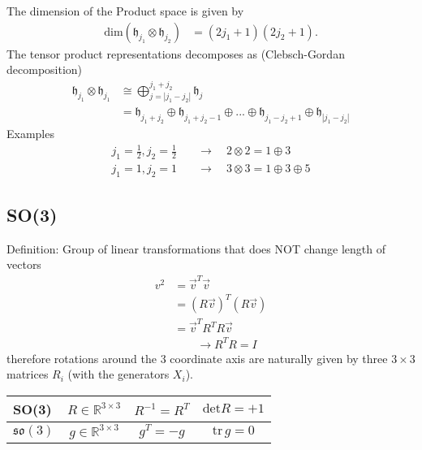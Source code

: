 \documentclass[../main.tex]{subfiles}
\begin{document}
\begin{itemize}
The dimension of the Product space is given by
\begin{align}
\text{dim}(\mathfrak{h}_{j_1} \otimes \mathfrak{h}_{j_2})&=(2j_1+1)(2j_2+1).
\end{align}
The tensor product representations decomposes as ({\sc Clebsch-Gordan} decomposition)
\begin{align}
    \mathfrak{h}_{j_1} \otimes \mathfrak{h}_{j_1} &\cong \bigoplus_{j=|j_1-j_2|}^{j_1+j_2} \mathfrak{h}_{j}\\
    &=\mathfrak{h}_{j_1+j_2}\oplus \mathfrak{h}_{j_1+j_2-1}\oplus ... \oplus \mathfrak{h}_{j_1-j_2+1}\oplus \mathfrak{h}_{|j_1-j_2|}
\end{align}
Examples
\begin{align}
j_1=\frac{1}{2}, j_2=\frac{1}{2}&\quad\rightarrow\quad 2\otimes2=1\oplus3\\
j_1=1, j_2=1&\quad\rightarrow\quad 3\otimes3=1\oplus3\oplus5
\end{align}

\subsection{SO(3)}
Definition: Group of linear transformations that does NOT change length of vectors
\begin{align}
v^2
&=\vec{v}^T\vec{v}\\
&=(R\vec{v})^T(R\vec{v})\\
&=\vec{v}^TR^TR\vec{v}\\
&\qquad \rightarrow R^TR=I
\end{align}
therefore rotations around the 3 coordinate axis are naturally given by three  $3\times3$ matrices $R_i$ (with the generators $X_i$).
\begin{center}
\begin{tabular}{|l|c|c|c|}
\hline
SO(3)              & $R\in\mathbb{R}^{3\times3} $ & $R^{-1}=R^T$ & $\text{det}R=+1$ \\ \hline
$\mathfrak{so}(3)$ & $g\in\mathbb{R}^{3\times3} $ & $g^T=-g$ & $\text{tr}\,g=0$ \\ \hline
\end{tabular}
\end{center}


\end{itemize}
\end{document}
